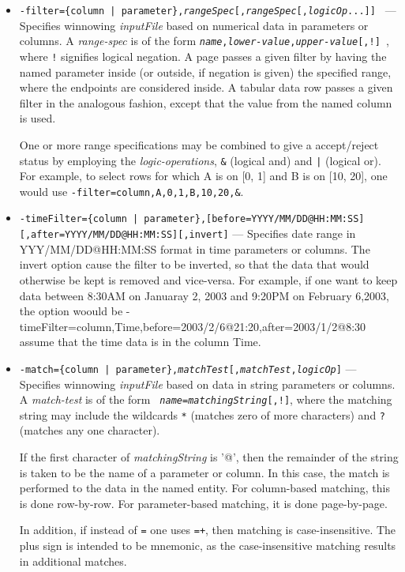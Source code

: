 \begin{itemize}
\begin{itemize}
   \begin{itemize}

   \item {\tt -filter=\{column | parameter\},{\em rangeSpec}[,{\em rangeSpec}[,{\em logicOp}...]] } ---
Specifies winnowing {\em inputFile} based on numerical data in parameters or columns.  A {\em range-spec} is of the
form {\tt {\em name},{\em lower-value},{\em upper-value}[,!] }, where \verb|!| signifies logical negation. A page
passes a given filter by having the named parameter inside (or outside, if negation is given) the specified range,
where the endpoints are considered inside.  A tabular data row passes a given filter in the analogous fashion, except
that the value from the named column is used.  

One or more range specifications may be combined to give a accept/reject status by employing the {\em
logic-operations}, \verb|&| (logical and) and \verb&|& (logical or).  For example, to select rows for
which A is on [0, 1] and B is on [10, 20], one would use
{\tt -filter=column,A,0,1,B,10,20,\&}.
        \item {\tt -timeFilter=\{column | parameter\},[before=YYYY/MM/DD@HH:MM:SS] [,after=YYYY/MM/DD@HH:MM:SS][,invert]} 
--- Specifies date range in YYY/MM/DD@HH:MM:SS format in time parameters or columns. The invert option cause the
filter to be inverted, so that the data that would otherwise be kept is removed and vice-versa. For example,
if one want to keep data between 8:30AM on Januaray 2, 2003 and 9:20PM on February 6,2003, the option woould be
     -timeFilter=column,Time,before=2003/2/6@21:20,after=2003/1/2@8:30
assume that the time data is in the column Time.

        \item {\tt -match=\{column | parameter\},{\em matchTest}[,{\em matchTest},{\em logicOp}]} --- Specifies
winnowing {\em inputFile} based on data in string parameters or columns.  A {\em match-test} is of the form {\tt {\em
name}={\em matchingString}[,!]}, where the matching string may include the wildcards \verb|*| (matches zero of more
characters) and \verb|?| (matches any one character). 

If the first character of {\em matchingString} is '@', then the remainder of the string is taken to be the name of a
parameter or column.  In this case, the match is performed to the data in the named entity.  For column-based matching,
this is done row-by-row.  For parameter-based matching, it is done page-by-page.

In addition, if instead of \verb|=| one uses \verb|=+|, then matching is case-insensitive.  The plus sign is intended
to be mnemonic, as the case-insensitive matching results in additional matches.


\end{itemize}
\end{itemize}
\end{itemize}
